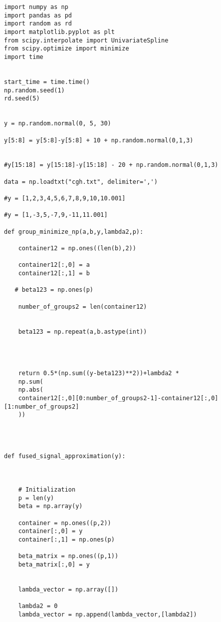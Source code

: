 \documentclass{article}
\theoremstyle{definition}
\begin{document}
\lstset{language=Python}
\lstset{frame=lines}
\lstset{basicstyle=\footnotesize}
\begin{lstlisting}
import numpy as np
import pandas as pd
import random as rd
import matplotlib.pyplot as plt
from scipy.interpolate import UnivariateSpline
from scipy.optimize import minimize
import time


start_time = time.time()
np.random.seed(1)
rd.seed(5)


y = np.random.normal(0, 5, 30)

y[5:8] = y[5:8]-y[5:8] + 10 + np.random.normal(0,1,3)


#y[15:18] = y[15:18]-y[15:18] - 20 + np.random.normal(0,1,3)

data = np.loadtxt("cgh.txt", delimiter=',')

#y = [1,2,3,4,5,6,7,8,9,10,10.001]

#y = [1,-3,5,-7,9,-11,11.001]

def group_minimize_np(a,b,y,lambda2,p):
    
    container12 = np.ones((len(b),2))
    
    container12[:,0] = a
    container12[:,1] = b
    
   # beta123 = np.ones(p)
    
    number_of_groups2 = len(container12)
    
    
    beta123 = np.repeat(a,b.astype(int))
    
   
            
            
    return 0.5*(np.sum((y-beta123)**2))+lambda2 * 
    np.sum(
    np.abs(
    container12[:,0][0:number_of_groups2-1]-container12[:,0][1:number_of_groups2]
    ))
        



def fused_signal_approximation(y):
   
    
  
    # Initialization
    p = len(y)
    beta = np.array(y)
    
    container = np.ones((p,2))
    container[:,0] = y
    container[:,1] = np.ones(p)
    
    beta_matrix = np.ones((p,1))
    beta_matrix[:,0] = y
    
    
    lambda_vector = np.array([])
    
    lambda2 = 0
    lambda_vector = np.append(lambda_vector,[lambda2])
    
    
    

\end{lstlisting}
\end{document}
